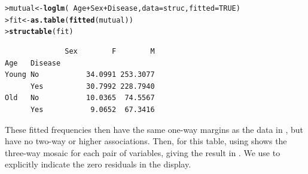 \documentclass[10pt,krantz2]{krantz}\usepackage[]{graphicx}\usepackage[]{color}
\makeatletter
\newcommand{\hlnum}[1]{\textcolor[rgb]{0.686,0.059,0.569}{#1}}%
\newcommand{\hlopt}[1]{\textcolor[rgb]{0,0,0}{#1}}%
\newcommand{\hlstd}[1]{\textcolor[rgb]{0.345,0.345,0.345}{#1}}%
\newcommand{\hlkwb}[1]{\textcolor[rgb]{0.69,0.353,0.396}{#1}}%
\newcommand{\hlkwc}[1]{\textcolor[rgb]{0.333,0.667,0.333}{#1}}%
\newcommand{\hlkwd}[1]{\textcolor[rgb]{0.737,0.353,0.396}{\textbf{#1}}}%
\newenvironment{kframe}{%
 \def\at@end@of@kframe{}%
 \ifinner\ifhmode%
  \def\at@end@of@kframe{\end{minipage}}%
  \begin{minipage}{\columnwidth}%
 \fi\fi%
 \def\FrameCommand##1{\hskip\@totalleftmargin \hskip-\fboxsep
 \colorbox{shadecolor}{##1}\hskip-\fboxsep
     \hskip-\linewidth \hskip-\@totalleftmargin \hskip\columnwidth}%
 \MakeFramed {\advance\hsize-\width
   \@totalleftmargin\z@ \linewidth\hsize
   \@setminipage}}%
 {\par\unskip\endMakeFramed%
 \at@end@of@kframe}
\newenvironment{knitrout}{}{} %
\renewenvironment{knitrout}{\small\renewcommand{\baselinestretch}{.85}}{} %
\makeatother
\begin{document}
\begin{knitrout}
\color{fgcolor}\begin{kframe}
\begin{alltt}
\hlstd{> }\hlstd{mutual} \hlkwb{<-} \hlkwd{loglm}\hlstd{(}\hlopt{~} \hlstd{Age} \hlopt{+} \hlstd{Sex} \hlopt{+} \hlstd{Disease,} \hlkwc{data} \hlstd{= struc,} \hlkwc{fitted} \hlstd{=} \hlnum{TRUE}\hlstd{)}
\hlstd{> }\hlstd{fit} \hlkwb{<-} \hlkwd{as.table}\hlstd{(}\hlkwd{fitted}\hlstd{(mutual))}
\hlstd{> }\hlkwd{structable}\hlstd{(fit)}
\end{alltt}
\begin{verbatim}
              Sex        F        M
Age   Disease                      
Young No           34.0991 253.3077
      Yes          30.7992 228.7940
Old   No           10.0365  74.5567
      Yes           9.0652  67.3416
\end{verbatim}
\end{kframe}
\end{knitrout}
These fitted frequencies then have the same one-way margins as the
data in , but have no two-way or higher associations.
Then,  for this table, using 
shows the three-way mosaic for each pair of variables, giving
the result in .  We use 
to explicitly indicate the zero residuals in the display.
\end{document}
